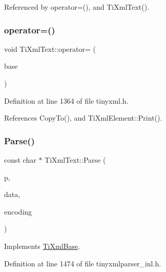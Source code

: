 Referenced by operator=(), and Ti\+Xml\+Text().

\hypertarget{class_ti_xml_text_af5f15d40d048cea7cab9d0eb4fd8a7d2}{}\label{class_ti_xml_text_af5f15d40d048cea7cab9d0eb4fd8a7d2} 
\subsubsection{\texorpdfstring{operator=()}{operator=()}}
{\footnotesize\ttfamily void Ti\+Xml\+Text\+::operator= (\begin{DoxyParamCaption}\item[{const \hyperlink{class_ti_xml_text}{Ti\+Xml\+Text} \&}]{base }\end{DoxyParamCaption})\hspace{0.3cm}{\ttfamily [inline]}}



Definition at line 1364 of file tinyxml.\+h.



References Copy\+To(), and Ti\+Xml\+Element\+::\+Print().

\hypertarget{class_ti_xml_text_a8d2dcfa41fc73d3e62dacc2fcf633819}{}\label{class_ti_xml_text_a8d2dcfa41fc73d3e62dacc2fcf633819} 
\subsubsection{\texorpdfstring{Parse()}{Parse()}}
{\footnotesize\ttfamily const char $\ast$ Ti\+Xml\+Text\+::\+Parse (\begin{DoxyParamCaption}\item[{const char $\ast$}]{p,  }\item[{\hyperlink{class_ti_xml_parsing_data}{Ti\+Xml\+Parsing\+Data} $\ast$}]{data,  }\item[{\hyperlink{tinyxml_8h_a88d51847a13ee0f4b4d320d03d2c4d96}{Ti\+Xml\+Encoding}}]{encoding }\end{DoxyParamCaption})\hspace{0.3cm}{\ttfamily [virtual]}}



Implements \hyperlink{class_ti_xml_base_a00e4edb0219d00a1379c856e5a1d2025}{Ti\+Xml\+Base}.



Definition at line 1474 of file tinyxmlparser\+\_\+inl.\+h.



